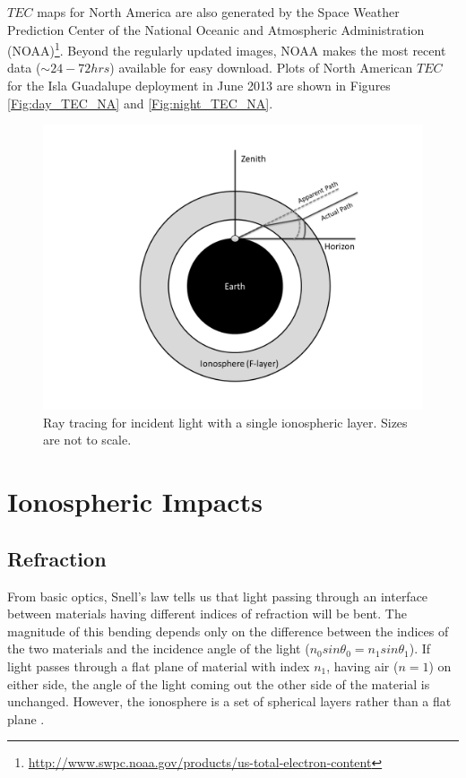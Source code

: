 $TEC$ maps for North America are also generated by the Space Weather Prediction Center of the National Oceanic and Atmospheric Administration (NOAA)\footnote{\url{http://www.swpc.noaa.gov/products/us-total-electron-content}}. Beyond the regularly updated images, NOAA makes the most recent data ($\sim 24-72 hrs$) available for easy download. Plots of North American $TEC$ for the Isla Guadalupe deployment in June 2013 are shown in Figures \ref{Fig:day_TEC_NA} and \ref{Fig:night_TEC_NA}. 

\begin{figure}[htb]
\begin{center}
\includegraphics[width=0.95\linewidth]{Ionosphere/figures/refraction.png}
\caption{Ray tracing for incident light with a single ionospheric layer. Sizes are not to scale. }
\label{Fig:iono_refrac}
\end{center}
\end{figure}



\section{Ionospheric Impacts}


\subsection{Refraction}

From basic optics, Snell's law tells us that light passing through an interface between materials having different indices of refraction will be bent. The magnitude of this bending depends only on the difference between the indices of the two materials and the incidence angle of the light ($n_0 sin \theta_0 = n_1 sin \theta_1$). If light passes through a flat plane of material with index $n_1$, having air ($n=1$) on either side, the angle of the light coming out the other side of the material is unchanged. However, the ionosphere is a set of spherical layers rather than a flat plane \cite{thompson_2001}. 

